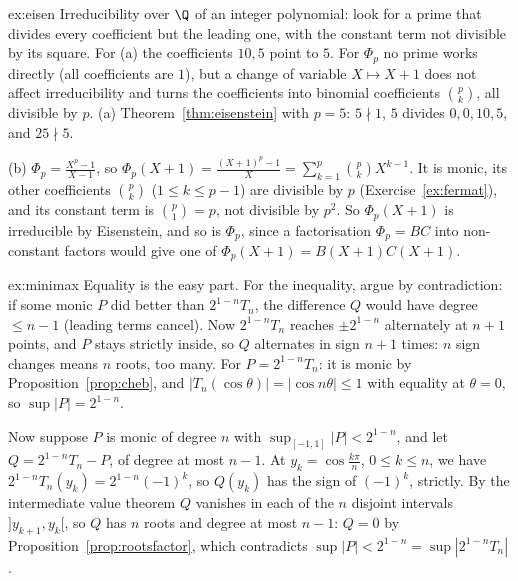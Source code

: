 \begin{solution}{ex:eisen}
\idea Irreducibility over $\Q$ of an integer polynomial: look for a prime that divides every coefficient but the leading one, with the constant term not divisible by its square. For (a) the coefficients $10,5$ point to $5$. For $\Phi_p$ no prime works directly (all coefficients are $1$), but a change of variable $X\mapsto X+1$ does not affect irreducibility and turns the coefficients into binomial coefficients $\binom pk$, all divisible by $p$.
\writeup (a) Theorem~\ref{thm:eisenstein} with $p=5$: $5\nmid1$, $5$ divides $0,0,10,5$, and $25\nmid5$.

(b) $\Phi_p=\frac{X^p-1}{X-1}$, so $\Phi_p(X+1)=\frac{(X+1)^p-1}X=\sum_{k=1}^p\binom pkX^{k-1}$. It is monic, its other coefficients
$\binom pk$ ($1\le k\le p-1$) are divisible by $p$ (Exercise~\ref{ex:fermat}), and its constant term is $\binom p1=p$, not divisible by $p^2$.
So $\Phi_p(X+1)$ is irreducible by Eisenstein, and so is $\Phi_p$, since a factorisation $\Phi_p=BC$ into non-constant factors would give one of $\Phi_p(X+1)=B(X+1)C(X+1)$.
\end{solution}

\begin{solution}{ex:minimax}
\idea Equality is the easy part. For the inequality, argue by contradiction: if some monic $P$ did better than $2^{1-n}T_n$, the difference $Q$ would have degree $\le n-1$ (leading terms cancel). Now $2^{1-n}T_n$ reaches $\pm2^{1-n}$ alternately at $n+1$ points, and $P$ stays strictly inside, so $Q$ alternates in sign $n+1$ times: $n$ sign changes means $n$ roots, too many.
\writeup For $P=2^{1-n}T_n$: it is monic by Proposition~\ref{prop:cheb}, and $|T_n(\cos\theta)|=|\cos n\theta|\le1$ with equality at $\theta=0$, so $\sup|P|=2^{1-n}$.

Now suppose $P$ is monic of degree $n$ with $\sup_{[-1,1]}|P|<2^{1-n}$, and let $Q=2^{1-n}T_n-P$, of degree at most $n-1$.
At $y_k=\cos\frac{k\pi}n$, $0\le k\le n$, we have $2^{1-n}T_n(y_k)=2^{1-n}(-1)^k$, so $Q(y_k)$ has the sign of $(-1)^k$, strictly.
By the intermediate value theorem $Q$ vanishes in each of the $n$ disjoint intervals $]y_{k+1},y_k[$, so $Q$ has $n$ roots and degree at most $n-1$: $Q=0$ by Proposition~\ref{prop:rootsfactor},
which contradicts $\sup|P|<2^{1-n}=\sup|2^{1-n}T_n|$.
\end{solution}

